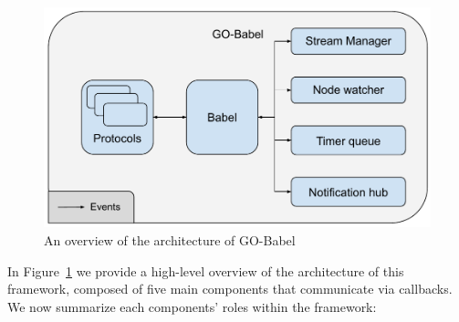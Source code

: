 \begin{figure}[htbp]
    \centering
    \includegraphics[width=\textwidth]{Chapters/Figures/Go-Babel-Overview.pdf}
    \caption{An overview of the architecture of GO-Babel}
    \label{fig:go-babel-overview}
\end{figure}

In Figure~\ref{fig:go-babel-overview} we provide a high-level overview of the architecture of this framework, composed of five main components that communicate via callbacks. We now summarize each components' roles within the framework:

